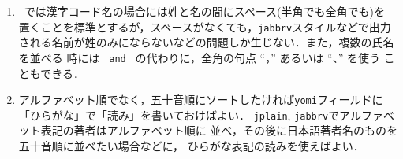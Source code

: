 \begin{enumerate}
Per Brinch~Hansenの名前は次のようにタイプしなければならない．
\begin{verbatim}
    "Brinch Hansen, Per"
\end{verbatim}
この名前の名は ``Per'' の1つのトークンからなり，
姓は ``Brinch'' と ``Hansen'' の2つのトークンからなり，
von, Jrの部分はない．
もし次のようにタイプしたとすると，
\begin{verbatim}
    "Per Brinch Hansen"
\end{verbatim}
\BibTeX\ は(誤って)，``John~Paul Jones'' の名トークンが ``Paul'' であるのと
同じように ``Brinch'' が名のトークンであると考え，2つの名トークンと
1つの姓トークンからなるものとする．

もう1つ例を示そう．
\begin{verbatim}
    "Charles Louis Xavier Joseph de la Vall{\'e}e Poussin"
\end{verbatim}
この名前には4つの名トークンと，2つのvonトークンと，2つの姓トークンがある．
vonパートは小文字で始まることから，\BibTeX\ は各々の部分がどこから始まり，
どこで終るかがわかる．

一般に中括弧のレベルが0のところで小文字で始まるものはvonトークンとされる．
技術的には「特殊文字」は中括弧のレベル0であるから，\TeX\ のコマンド
文字列の大文字，小文字を保つようなダミーの特殊文字を使うことで，
\BibTeX\ がvonトークンとして扱うように/扱わないようにできる．

まとめると，\BibTeX\ は名前の書き方として次の3つの形式を許す．
\begin{verbatim}
    "First von Last"
    "von Last, First"
    "von Last, Jr, First"
\end{verbatim}
Jrパートがある場合，あるいは姓が複数の構成要素からなる場合以外では
一番最初の書き方を使うのが普通である．

\item
\JBibTeX\ では漢字コード名の場合には姓と名の間にスペース(半角でも全角でも)を
置くことを標準とするが，スペースがなくても，{\tt jabbrv}スタイルなどで出力
される名前が姓のみにならないなどの問題しか生じない．また，複数の氏名を並べる
時には \verb*| and | の代わりに，全角の句点 ``，'' あるいは ``、'' を使う
こともできる．

\item アルファベット順でなく，五十音順にソートしたければ{\tt yomi}フィールドに
「ひらがな」で「読み」を書いておけばよい．
{\tt jplain}, {\tt jabbrv}でアルファベット表記の著者はアルファベット順に
並べ，その後に日本語著者名のものを五十音順に並べたい場合などに，
ひらがな表記の読みを使えばよい．


\end{enumerate}
